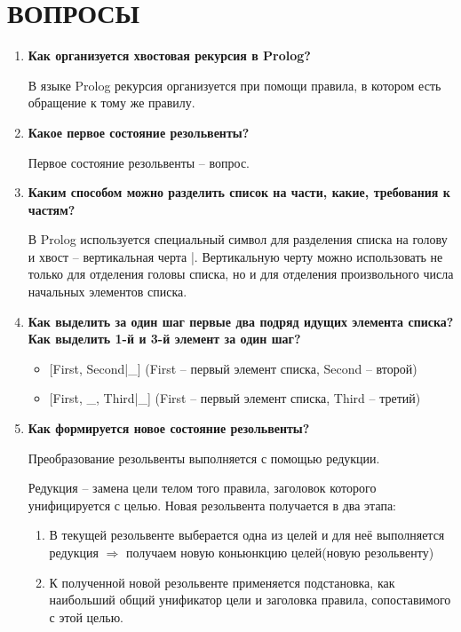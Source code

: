 \section{ВОПРОСЫ}

\begin{enumerate}
    \item \textbf{Как организуется хвостовая рекурсия в Prolog?}

        В языке Prolog рекурсия организуется при помощи правила, в котором есть обращение к тому же правилу.

    \item \textbf{Какое первое состояние резольвенты?}

        Первое состояние резольвенты -- вопрос.

    \item \textbf{Каким способом можно разделить список на части, какие, требования к частям?}

        В Prolog используется специальный символ для разделения списка на голову и хвост -- вертикальная черта |. Вертикальную черту можно использовать не только для отделения головы списка, но и для отделения произвольного числа начальных элементов списка.

    \item \textbf{Как выделить за один шаг первые два подряд идущих элемента списка? Как выделить 1-й и 3-й элемент за один шаг?}

        \begin{itemize}
            \item {[First, Second|\_]} (First -- первый элемент списка, Second -- второй)
            \item {[First, \_, Third|\_]} (First -- первый элемент списка, Third -- третий)
        \end{itemize}

    \item \textbf{Как формируется новое состояние резольвенты?}

        Преобразование резольвенты выполняется с помощью редукции.

        Редукция -- замена цели телом того правила, заголовок которого унифицируется с целью.
        Новая резольвента получается в два этапа:

        \begin{enumerate}
            \item В текущей резольвенте выберается одна из целей и для неё выполняется редукция $\Rightarrow$ получаем новую коньюнкцию целей(новую резольвенту)
            \item К полученной новой резольвенте применяется подстановка, как наибольший общий унификатор цели и заголовка правила, сопоставимого с этой целью.
        \end{enumerate}


\end{enumerate}
